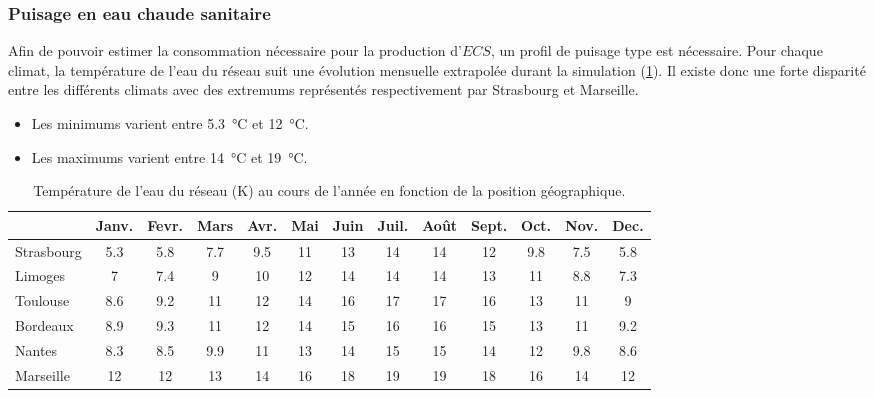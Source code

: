 \subsubsection{Puisage en eau chaude sanitaire} %
\label{ssub:puisage_en_eau_chaude_sanitaire}
Afin de pouvoir estimer la consommation nécessaire pour la production d’$ECS$, un profil
de puisage type est nécessaire. Pour chaque climat, la température de l’eau du réseau suit
une évolution mensuelle extrapolée durant la simulation
(\ref{tab:temp_eau}). Il existe donc une forte disparité entre les différents climats
avec des extremums représentés respectivement par Strasbourg et Marseille.
\begin{itemize}
    \item Les minimums varient entre \SI{5.3}{\celsius} et \SI{12}{\celsius}.
    \item Les maximums varient entre \SI{14}{\celsius} et \SI{19}{\celsius}.
\end{itemize}

\begin{table}
\centering
\caption{Température de l'eau du réseau (\si{\kelvin}) au cours de l'année en fonction de la
         position géographique.}
\label{tab:temp_eau}
\begin{tabular}{l*{12}{c}}
    \toprule
               & Janv. & Fevr. & Mars & Avr. & Mai & Juin & Juil. & Août & Sept. & Oct. & Nov. & Dec. \\
    \midrule
    Strasbourg & \num{5.3}   & \num{5.8}   & \num{7.7}  & \num{9.5}  & \num{11}  & \num{13}   & \num{14}    & \num{14}   & \num{12}    & \num{9.8}  & \num{7.5}  & \num{5.8}  \\
    Limoges    & \num{7}     & \num{7.4}   & \num{9}    & \num{10}   & \num{12}  & \num{14}   & \num{14}    & \num{14}   & \num{13}    & \num{11}   & \num{8.8}  & \num{7.3}  \\
    Toulouse   & \num{8.6}   & \num{9.2}   & \num{11}   & \num{12}   & \num{14}  & \num{16}   & \num{17}    & \num{17}   & \num{16}    & \num{13}   & \num{11}   & \num{9}    \\
    Bordeaux   & \num{8.9}   & \num{9.3}   & \num{11}   & \num{12}   & \num{14}  & \num{15}   & \num{16}    & \num{16}   & \num{15}    & \num{13}   & \num{11}   & \num{9.2}  \\
    Nantes     & \num{8.3}   & \num{8.5}   & \num{9.9}  & \num{11}   & \num{13}  & \num{14}   & \num{15}    & \num{15}   & \num{14}    & \num{12}   & \num{9.8}  & \num{8.6}  \\
    Marseille  & \num{12}    & \num{12}    & \num{13}   & \num{14}   & \num{16}  & \num{18}   & \num{19}    & \num{19}   & \num{18}    & \num{16}   & \num{14}   & \num{12}   \\
    \bottomrule
\end{tabular}
\end{table}


